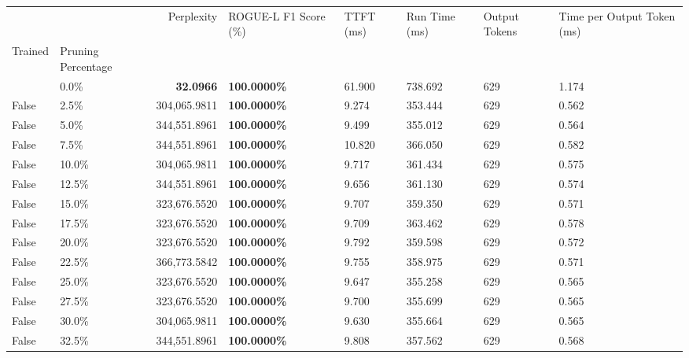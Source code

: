 \begin{table}[H]
\label{tab:evaluation-pipeline-1-untrained}
\begin{tabular}{|m{}| m{}| r | R{0.13\textwidth}| R{0.09\textwidth}| R{0.09\textwidth}| R{0.09\textwidth}| R{0.11\textwidth}|}
\toprule
 &  & Perplexity & ROGUE-L F1 Score (\%) & TTFT (ms) & Run Time (ms) & Output Tokens & Time per Output Token (ms) \\
Trained & Pruning Percentage &  &  &  &  &  &  \\
\midrule
 & 0.0\% & \bfseries 32.0966 & \bfseries 100.0000\% & 61.900 & 738.692 & 629 & 1.174 \\
False & 2.5\% & \color{red} 304,065.9811 & \bfseries \color{red} 100.0000\% & 9.274 & 353.444 & 629 & 0.562 \\
False & 5.0\% & 344,551.8961 & \bfseries \color{red} 100.0000\% & 9.499 & 355.012 & 629 & 0.564 \\
False & 7.5\% & 344,551.8961 & \bfseries \color{red} 100.0000\% & 10.820 & 366.050 & 629 & 0.582 \\
False & 10.0\% & \color{red} 304,065.9811 & \bfseries \color{red} 100.0000\% & 9.717 & 361.434 & 629 & 0.575 \\
False & 12.5\% & 344,551.8961 & \bfseries \color{red} 100.0000\% & 9.656 & 361.130 & 629 & 0.574 \\
False & 15.0\% & 323,676.5520 & \bfseries \color{red} 100.0000\% & 9.707 & 359.350 & 629 & 0.571 \\
False & 17.5\% & 323,676.5520 & \bfseries \color{red} 100.0000\% & 9.709 & 363.462 & 629 & 0.578 \\
False & 20.0\% & 323,676.5520 & \bfseries \color{red} 100.0000\% & 9.792 & 359.598 & 629 & 0.572 \\
False & 22.5\% & 366,773.5842 & \bfseries \color{red} 100.0000\% & 9.755 & 358.975 & 629 & 0.571 \\
False & 25.0\% & 323,676.5520 & \bfseries \color{red} 100.0000\% & 9.647 & 355.258 & 629 & 0.565 \\
False & 27.5\% & 323,676.5520 & \bfseries \color{red} 100.0000\% & 9.700 & 355.699 & 629 & 0.565 \\
False & 30.0\% & \color{red} 304,065.9811 & \bfseries \color{red} 100.0000\% & 9.630 & 355.664 & 629 & 0.565 \\
False & 32.5\% & 344,551.8961 & \bfseries \color{red} 100.0000\% & 9.808 & 357.562 & 629 & 0.568 \\

\end{tabular}
\end{table}
